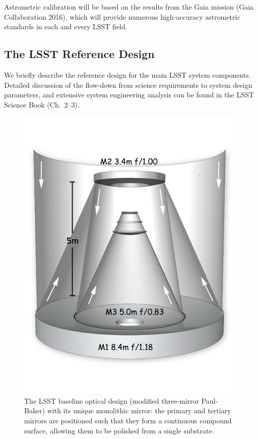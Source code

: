 Astrometric calibration will be based on the results from the Gaia mission (Gaia Collaboration 2016), which will provide
numerous high-accuracy astrometric standards in each and every LSST field.

\subsection{     The LSST  Reference Design    }

We briefly describe the reference design for the main LSST system components.
Detailed discussion of the flow-down from science requirements to system
design parameters, and extensive system engineering analysis can be
found in the LSST Science Book (Ch.~2--3).

\begin{figure}
\vskip -0.5in
\includegraphics[width=1.0\hsize,clip]{mirrors.pdf}
\vskip -0.5in
\caption{The LSST baseline optical design (modified three-mirror
  Paul-Baker) with its unique 
monolithic mirror: the primary and tertiary mirrors are positioned such 
that they form a continuous compound surface, allowing them to be polished 
from a single substrate.}
\label{Fig:optics}
\end{figure}


